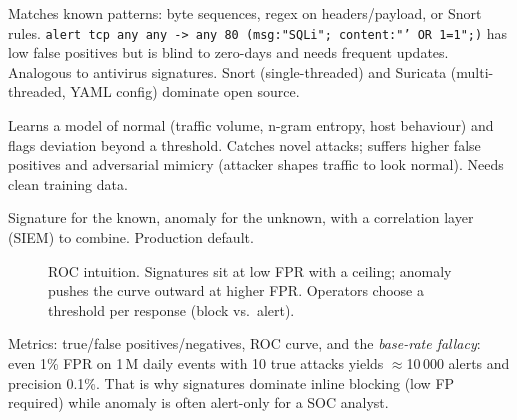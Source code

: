 \begin{description}[leftmargin=1.2em,itemsep=0.35em]
    \item[Signature-based] Matches known patterns: byte sequences, regex on
    headers/payload, or Snort rules.
    \texttt{alert tcp any any -> any 80 (msg:"SQLi"; content:"' OR 1=1";)}
    has low false positives but is blind to zero-days and needs frequent
    updates. Analogous to antivirus signatures. Snort (single-threaded) and
    Suricata (multi-threaded, YAML config) dominate open source.
    \item[Anomaly-based] Learns a model of normal (traffic volume, n-gram
    entropy, host behaviour) and flags deviation beyond a threshold. Catches
    novel attacks; suffers higher false positives and adversarial mimicry
    (attacker shapes traffic to look normal). Needs clean training data.
    \item[Hybrid] Signature for the known, anomaly for the unknown, with a
    correlation layer (SIEM) to combine. Production default.
\end{description}

\begin{figure}[h]\centering
{}
\caption{ROC intuition. Signatures sit at low FPR with a ceiling; anomaly pushes the curve outward at higher FPR. Operators choose a threshold per response (block vs.\ alert).}
\label{fig:roc}
\end{figure}

Metrics: true/false positives/negatives, ROC curve, and the \emph{base-rate
fallacy}: even 1\% FPR on 1\,M daily events with 10 true attacks yields
$\approx$10\,000 alerts and precision 0.1\%. That is why signatures dominate
inline blocking (low FP required) while anomaly is often alert-only for a SOC
analyst.

